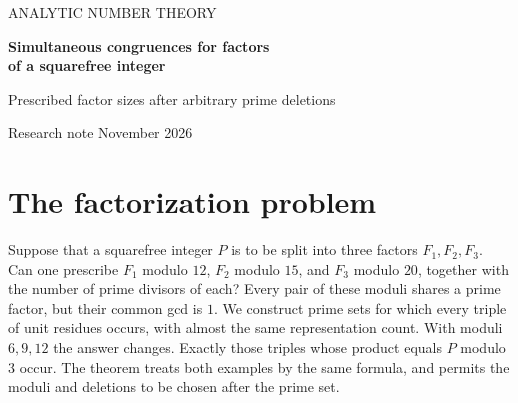 \documentclass[11pt]{article}
\begin{document}
\thispagestyle{plain}
\begin{center}
{\small\sffamily ANALYTIC NUMBER THEORY}\par\vspace{.85em}
{\LARGE\bfseries Simultaneous congruences for factors\\[3pt] of a squarefree integer}\par\vspace{.55em}
{\large Prescribed factor sizes after arbitrary prime deletions}\par\vspace{.65em}
{\small Research note  November 2026}
\end{center}
\begin{abstract}
One set of small primes permits joint control of every factor in an ordered factorization. Fix an erasure fraction below one half and a relative error $Q^{-A}$. For up to $R$ factors, we select $O(R\log Q)$ distinct primes of size $O(\log^2 Q)$. After the erasures and removal of primes dividing any prescribed modulus, each factor may be assigned its own modulus $q_j\le Q$ and a prescribed number of primes of order at least $\log Q$. The residue vectors are pointwise equidistributed subject to a single product congruence modulo $\gcd_j q_j$. This holds for $R$ as large as a constant times $\log Q/\log\log Q$. An adversarial deletion modulo $3$ and a lower bound on a hypergeometric character average give matching orders for the number of primes and the maximal number of factors. At any fixed retained fraction $a>0$ and fixed $r$, at most $\lfloor 1/a\rfloor^{r-1}$ residual classes suffice to describe support after fixing the total product. This bound is sharp. The analytic input is the Dirichlet GRH theorem. The partition estimates and lower bounds are unconditional.
\end{abstract}

\section{The factorization problem}
Suppose that a squarefree integer $P$ is to be split into three factors $F_1,F_2,F_3$.
Can one prescribe $F_1$ modulo $12$, $F_2$ modulo $15$, and $F_3$ modulo $20$, together with the number of prime divisors of each?
Every pair of these moduli shares a prime factor, but their common gcd is $1$. We construct prime sets for which every triple of unit residues occurs, with almost the same representation count. With moduli $6,9,12$ the answer changes. Exactly those triples whose product equals $P$ modulo $3$ occur. The theorem treats both examples by the same formula, and permits the moduli and deletions to be chosen after the prime set.
\end{document}
